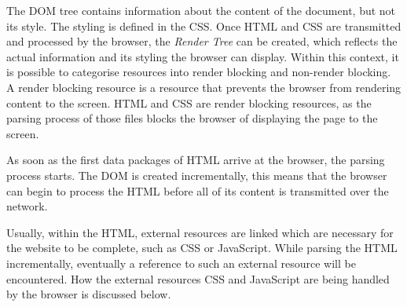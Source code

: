 


The DOM tree contains information about the content of the document, but not its style.
The styling is defined in the CSS.
Once HTML and CSS are transmitted and processed by the browser, the \textit{Render Tree} can be created, which reflects the actual information and its styling the browser can display.
Within this context, it is possible to categorise resources into render blocking and non-render blocking.
A render blocking resource is a resource that prevents the browser from rendering content to the screen.
HTML and CSS are render blocking resources, as the parsing process of those files blocks the browser of displaying the page to the screen.%




As soon as the first data packages of HTML arrive at the browser, the parsing process starts. %
The DOM is created incrementally,  this means that the browser can begin to process the HTML before all of its content is transmitted over the network.



Usually, within the HTML, external resources are linked which are necessary for the website to be complete, such as CSS or JavaScript.
While parsing the HTML incrementally, eventually a reference to such an external resource will be encountered.
How the external resources CSS and JavaScript are being handled by the browser is discussed below.







